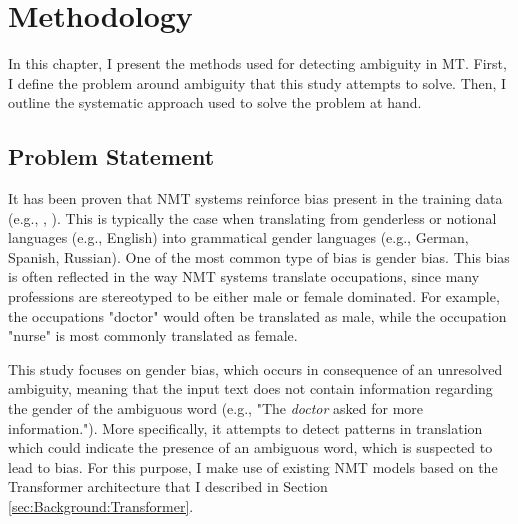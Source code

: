\chapter{Methodology}
\label{ch:Methodology}


In this chapter, I present the methods used for detecting ambiguity in MT. First, I define the problem around ambiguity that this study attempts to solve. Then, I outline the systematic approach used to solve the problem at hand.

\section{Problem Statement}
\label{sec:Methodology:Problem}

It has been proven that NMT systems reinforce bias present in the training data (e.g., \citet{Prates_2019}, \citet{Stanovsky_2019}). This is typically the case when translating from genderless or notional languages (e.g., English) into grammatical gender languages (e.g., German, Spanish, Russian). One of the most common type of bias is gender bias. 
This bias is often reflected in the way NMT systems translate occupations, since many professions are stereotyped to be either male or female dominated. For example, the occupations "doctor" would often be translated as male, while the occupation "nurse" is most commonly translated as female. 

This study focuses on gender bias, which occurs in consequence of an unresolved ambiguity, meaning that the input text does not contain information regarding the gender of the ambiguous word (e.g., "The \textit{doctor} asked for more information."). More specifically, it attempts to detect patterns in translation which could indicate the presence of an ambiguous word, which is suspected to lead to bias. For this purpose, I make use of existing NMT models based on the Transformer architecture that I described in Section \ref{sec:Background:Transformer}.
 

